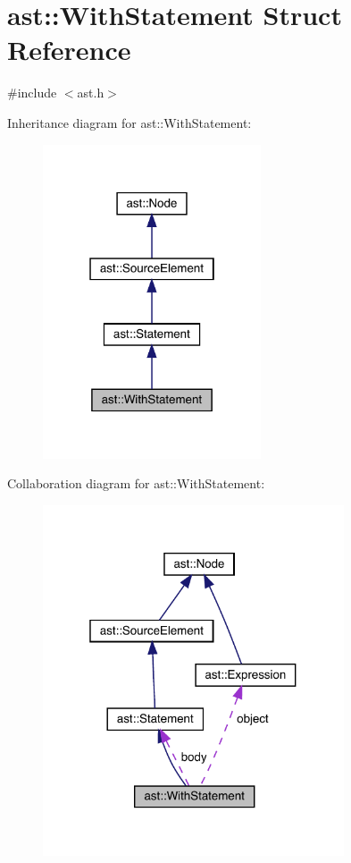 \hypertarget{structast_1_1_with_statement}{}\section{ast\+:\+:With\+Statement Struct Reference}
\label{structast_1_1_with_statement}


{\ttfamily \#include $<$ast.\+h$>$}



Inheritance diagram for ast\+:\+:With\+Statement\+:\nopagebreak
\begin{figure}[H]
\begin{center}
\leavevmode
\includegraphics[width=183pt]{structast_1_1_with_statement__inherit__graph}
\end{center}
\end{figure}


Collaboration diagram for ast\+:\+:With\+Statement\+:\nopagebreak
\begin{figure}[H]
\begin{center}
\leavevmode
\includegraphics[width=253pt]{structast_1_1_with_statement__coll__graph}
\end{center}
\end{figure}
